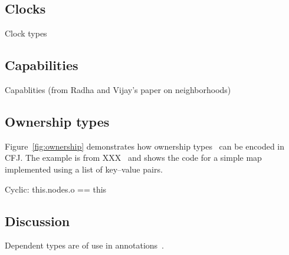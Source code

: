 \subsection{Clocks}

Clock types

\subsection{Capabilities}

Capablities (from Radha and Vijay's paper on neighborhoods)

\subsection{Ownership types}

Figure~\ref{fig:ownership} demonstrates how ownership
types~\cite{ownership-types} can be encoded in CFJ.
The example is from XXX~\cite{???} and shows the code for a
simple map implemented using a list of key--value pairs.

Cyclic: this.nodes.o == this

\begin{figure*}

\caption{Ownership types}
\label{fig:ownership}
\end{figure*}

\subsection{Discussion}

Dependent types are of use in annotations~\cite{ns07-x10anno}.
